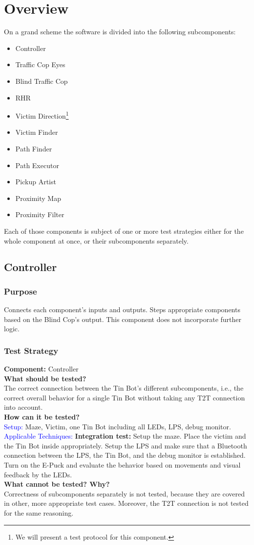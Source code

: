 \documentclass[a4paper,parskip,headheight=38pt]{scrartcl} %
\newcommand{\teststrat}[5]{
    \subsubsection{Test Strategy}
	\textbf{Component:} #1 \\
	\noindent\textbf{What should be tested?} \\
    \noindent #2 \\
	\noindent\textbf{How can it be tested?} \\
    \noindent\textcolor{blue}{Setup:} #3 \\
    \noindent\textcolor{blue}{Applicable Techniques:} #4 \\
	\noindent\textbf{What cannot be tested? Why?} \\
    \noindent #5
}
\newcommand{\ie}{i.e.}
\newcommand{\BLACK}{\textbf{Integration test: }}
\begin{document}
\section{Overview}

On a grand scheme the software is divided into the following subcomponents:

\begin{itemize}
	\item Controller
	\item Traffic Cop Eyes
	\item Blind Traffic Cop 
	\item RHR
	\item Victim Direction\footnote{We will present a test protocol
   for this component.}
	\item Victim Finder
	\item Path Finder
	\item Path Executor
	\item Pickup Artist
    \item Proximity Map
    \item Proximity Filter
\end{itemize}

Each of those components is subject of one or more test strategies either for
the whole component at once, or their subcomponents separately.
\subsection{Controller}
\subsubsection{Purpose}
	Connects each component's inputs and outputs. Steps appropriate components
    based on the Blind Cop's output. This component does not incorporate further
    logic.
\teststrat{Controller}{
    The correct connection between the Tin Bot's different subcomponents, \ie,
    the correct overall behavior for a single Tin Bot without taking any T2T
    connection into account.
}{
    Maze, Victim, one Tin Bot including all LEDs, LPS, debug monitor.
}{
    \BLACK Setup the maze. Place the victim and the Tin Bot inside
    appropriately. Setup
    the LPS and make sure that a Bluetooth connection between the LPS, the Tin
    Bot, and the debug monitor is established. Turn on the E-Puck and evaluate
    the behavior based on movements and visual feedback by the LEDs.
}{
    Correctness of subcomponents separately is not tested, because they are
    covered in other, more appropriate test cases. Moreover, the T2T connection
    is not tested for the same reasoning.
}
%
\end{document}
